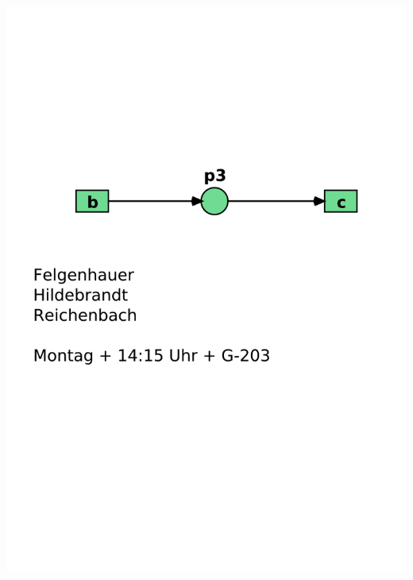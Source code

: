 \documentclass[12pt,a4paper]{../krautsourcing/homework}
\begin{document}
\subsection{}
\includegraphics[scale=0.35,trim={20mm 180mm 15mm 70mm},clip]{Aufgabe_6-4/Aufgabe_6-4-3.pdf}
\end{document}
